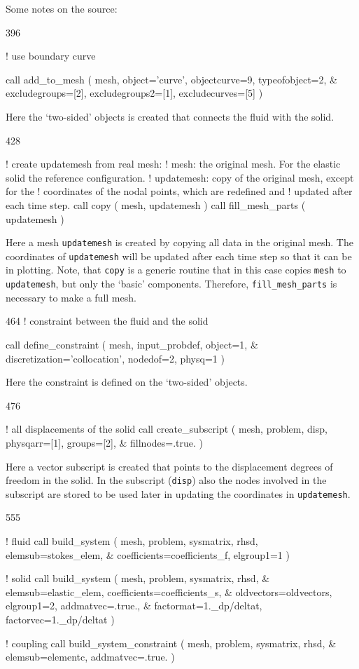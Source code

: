 Some notes on the source:
\begin{listing}{396}

!   use boundary curve

    call add_to_mesh ( mesh, object='curve', objectcurve=9, typeofobject=2, &
      excludegroups=[2], excludegroups2=[1], excludecurves=[5] ) 

\end{listing}
Here the `two-sided' objects is created that connects the fluid with the solid.
\begin{listing}{428}

! create updatemesh from real mesh:
!   mesh: the original mesh. For the elastic solid the reference configuration.
!   updatemesh: copy of the original mesh, except for the
!               coordinates of the nodal points, which are redefined and
!               updated after each time step.
  call copy ( mesh, updatemesh )
  call fill_mesh_parts ( updatemesh )

\end{listing}
Here a mesh \texttt{updatemesh} is created by copying all data in the
original mesh. The coordinates of \texttt{updatemesh} will be
updated after each time step so that it can be in plotting.
Note, that \texttt{copy} is a generic routine that in this case copies 
\texttt{mesh} to \texttt{updatemesh}, but only the `basic' components.
Therefore, \texttt{fill\_mesh\_parts} is necessary to make a full mesh.
\begin{listing}{464}
! constraint between the fluid and the solid

  call define_constraint ( mesh, input_probdef, object=1, &
    discretization='collocation', nodedof=2, physq=1 )

\end{listing}
Here the constraint is defined on the `two-sided' objects.
\begin{listing}{476}

! all displacements of the solid
  call create_subscript ( mesh, problem, disp, physqarr=[1], groups=[2], &
    fillnodes=.true. )
\end{listing}
Here a vector subscript is created that points to the displacement degrees of
freedom in the solid. In the subscript (\texttt{disp}) also the nodes involved
in the subscript are stored to be used later in updating the coordinates in 
\texttt{updatemesh}.
\begin{listing}{555}

!     fluid
      call build_system ( mesh, problem, sysmatrix, rhsd, elemsub=stokes_elem, &
        coefficients=coefficients_f, elgroup1=1 )

!     solid
      call build_system ( mesh, problem, sysmatrix, rhsd, &
        elemsub=elastic_elem, coefficients=coefficients_s, &
        oldvectors=oldvectors, elgroup1=2, addmatvec=.true., &
        factormat=1._dp/deltat, factorvec=1._dp/deltat )

!     coupling
      call build_system_constraint ( mesh, problem, sysmatrix, rhsd, &
        elemsub=elementc, addmatvec=.true. )

\end{listing}
